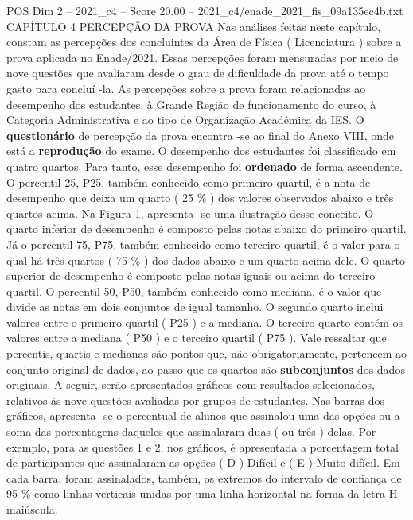 \begin{textsample}{POS Dim 2 – 2021\_c4 – Score 20.00 – 2021\_c4/enade\_2021\_fis\_09a135ec4b.txt}  \label{ex:f2_pos_037}
CAPÍTULO 4 PERCEPÇÃO DA PROVA Nas análises feitas neste capítulo, constam as percepções dos concluintes da Área de Física ( Licenciatura ) sobre a prova aplicada no Enade/2021.
Essas percepções foram mensuradas por meio de nove questões que avaliaram desde o grau de dificuldade da prova até o tempo gasto para concluí -la.
As percepções sobre a prova foram relacionadas ao desempenho dos estudantes, à Grande Região de funcionamento do curso, à Categoria Administrativa e ao tipo de Organização Acadêmica da IES.
O \textbf{questionário} de percepção da prova encontra -se ao final do Anexo VIII, onde está a \textbf{reprodução} do exame.
O desempenho dos estudantes foi classificado em quatro quartos.
Para tanto, esse desempenho foi \textbf{ordenado} de forma ascendente.
O percentil 25, P25, também conhecido como primeiro quartil, é a nota de desempenho que deixa um quarto ( 25 \% ) dos valores observados abaixo e três quartos acima.
Na Figura 1, apresenta -se uma ilustração desse conceito.
O quarto inferior de desempenho é composto pelas notas abaixo do primeiro quartil.
Já o percentil 75, P75, também conhecido como terceiro quartil, é o valor para o qual há três quartos ( 75 \% ) dos dados abaixo e um quarto acima dele.
O quarto superior de desempenho é composto pelas notas iguais ou acima do terceiro quartil.
O percentil 50, P50, também conhecido como mediana, é o valor que divide as notas em dois conjuntos de igual tamanho.
O segundo quarto inclui valores entre o primeiro quartil ( P25 ) e a mediana.
O terceiro quarto contém os valores entre a mediana ( P50 ) e o terceiro quartil ( P75 ).
Vale ressaltar que percentis, quartis e medianas são pontos que, não obrigatoriamente, pertencem ao conjunto original de dados, ao passo que os quartos são \textbf{subconjuntos} dos dados originais.
A seguir, serão apresentados gráficos com resultados selecionados, relativos às nove questões avaliadas por grupos de estudantes.
Nas barras dos gráficos, apresenta -se o percentual de alunos que assinalou uma das opções ou a soma das porcentagens daqueles que assinalaram duas ( ou três ) delas.
Por exemplo, para as questões 1 e 2, nos gráficos, é apresentada a porcentagem total de participantes que assinalaram as opções ( D ) Difícil e ( E ) Muito difícil.
Em cada barra, foram assinalados, também, os extremos do intervalo de confiança de 95 \% como linhas verticais unidas por uma linha horizontal na forma da letra H maiúscula.

\end{textsample}
